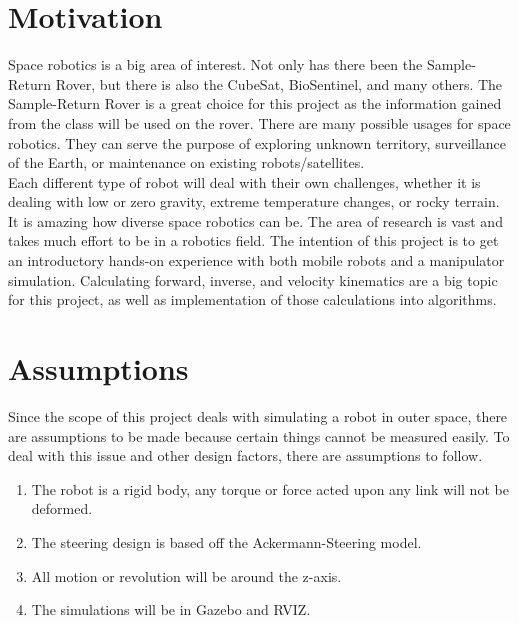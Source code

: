 \section{Motivation}
Space robotics is a big area of interest. Not only has there been the Sample-Return Rover, but there is also the CubeSat, BioSentinel, and many others. The Sample-Return Rover is a great choice for this project as the information gained from the class will be used on the rover. There are many possible usages for space robotics. They can serve the purpose of exploring unknown territory, surveillance of the Earth, or maintenance on existing robots/satellites. \\

Each different type of robot will deal with their own challenges, whether it is dealing with low or zero gravity, extreme temperature changes, or rocky terrain. It is amazing how diverse space robotics can be. The area of research is vast and takes much effort to be in a robotics field. The intention of this project is to get an introductory hands-on experience with both mobile robots and a manipulator simulation. Calculating forward, inverse, and velocity kinematics are a big topic for this project, as well as implementation of those calculations into algorithms.

\section{Assumptions}
Since the scope of this project deals with simulating a robot in outer space, there are assumptions to be made because certain things cannot be measured easily. To deal with this issue and other design factors, there are assumptions to follow.

\begin{enumerate}
	\item The robot is a rigid body, any torque or force acted upon any link will not be deformed.
	\item The steering design is based off the Ackermann-Steering model.
	\item All motion or revolution will be around the z-axis.
	\item The simulations will be in Gazebo and RVIZ.
\end{enumerate}
